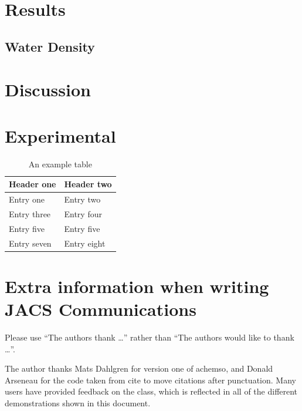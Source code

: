 \documentclass[journal=jacsat,manuscript=article]{achemso}
\begin{document}
\section{Results}

\subsection{Water Density }


\subsection{}

\section{Discussion}






\section{Experimental}

\begin{table}
  \caption{An example table}
  \label{tbl:example}
  \begin{tabular}{ll}
    \hline
    Header one  & Header two  \\
    \hline
    Entry one   & Entry two   \\
    Entry three & Entry four  \\
    Entry five  & Entry five  \\
    Entry seven & Entry eight \\
    \hline
  \end{tabular}
\end{table}



\section{Extra information when writing JACS Communications}


\begin{acknowledgement}

Please use ``The authors thank \ldots'' rather than ``The
authors would like to thank \ldots''.

The author thanks Mats Dahlgren for version one of \textsf{achemso},
and Donald Arseneau for the code taken from \textsf{cite} to move
citations after punctuation. Many users have provided feedback on the
class, which is reflected in all of the different demonstrations
shown in this document.

\end{acknowledgement}
\end{document}
